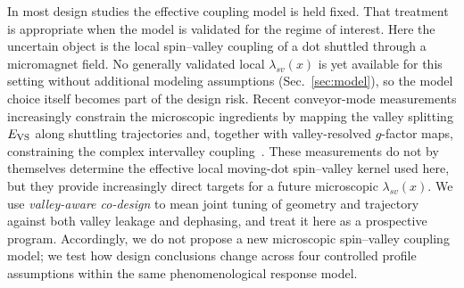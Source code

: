 \documentclass[aip,jap,reprint,superscriptaddress,longbibliography,floatfix]{revtex4-2}
\begin{document}
In most design studies the effective coupling model is held fixed. That
treatment is appropriate when the model is validated for the regime of
interest. Here the uncertain object is the local spin--valley coupling of a dot
shuttled through a micromagnet field. No generally validated local $\lambda_{sv}(x)$ is yet
available for this setting without additional modeling assumptions
(Sec.~\ref{sec:model}), so the model choice itself becomes part of the design
risk. Recent conveyor-mode measurements increasingly constrain the microscopic
ingredients by mapping the valley splitting $E_{\rm VS}$ along shuttling
trajectories and, together with valley-resolved $g$-factor maps, constraining
the complex intervalley coupling~\cite{volmer_impact_2026,volmer_gfactor_2026}.
These measurements do not by themselves determine the effective local
moving-dot spin--valley kernel used here, but they provide increasingly direct
targets for a future microscopic $\lambda_{sv}(x)$. We use
\emph{valley-aware co-design} to mean joint tuning of geometry and trajectory
against both valley leakage and dephasing, and treat it here as a prospective
program. Accordingly, we do not propose a new microscopic spin--valley coupling
model; we test how design conclusions change across four controlled profile
assumptions within the same phenomenological response model.
\end{document}
